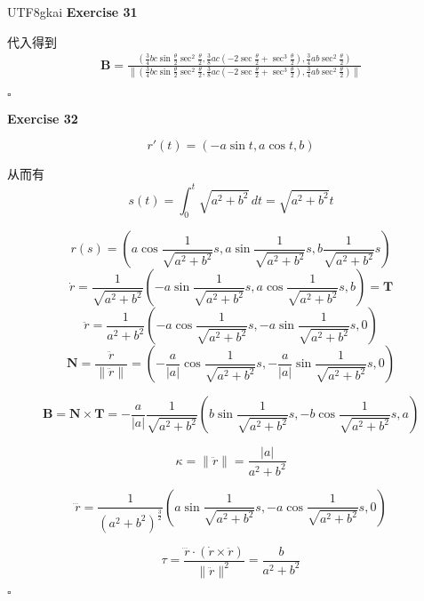 \documentclass[11pt,hyperref,a4paper,UTF8]{ctexart}
\newenvironment{exercise}[1]{%
{\textbf{Exercise #1} \\ 
    }
}{
  \hfill $\square$ 
  \par\bigskip 
}
\newcommand{\parameter}[1]{\left(#1\right)}
\newcommand{\ve}{\boldsymbol}
\begin{document}
\begin{CJK}{UTF8}{gkai}
\begin{exercise}{31}
    代入得到
    \[
        \begin{aligned}
        \ve{B} =  \frac{\parameter{\frac{3}{4}bc \sin \frac{\theta}{2} \sec^2 \frac{\theta}{2},\frac{3}{8}ac(-2\sec \frac{\theta}{2} + \sec^3 \frac{\theta}{2}),\frac{3}{4}ab\sec^2 \frac{\theta}{2}}}{\left\|\parameter{\frac{3}{4}bc \sin \frac{\theta}{2} \sec^2 \frac{\theta}{2},\frac{3}{8}ac(-2\sec \frac{\theta}{2} + \sec^3 \frac{\theta}{2}),\frac{3}{4}ab\sec^2 \frac{\theta}{2}}\right\|}
    \end{aligned}
    \]

\end{exercise}

\begin{exercise}{32}
    \[r'(t) = (-a\sin t,a \cos t,b)\]

    从而有
    \[s(t) = \int_{0}^{t}\sqrt{a^2 + b^2}\,dt = \sqrt{a^2 + b^2} t\]

    \[r(s) = (a \cos \frac{1}{\sqrt{a^2 + b^2}} s,a \sin \frac{1}{\sqrt{a^2 + b^2}} s,b \frac{1}{\sqrt{a^2 + b^2}} s)\]
    \[\dot{r} = \frac{1}{\sqrt{a^2 + b^2}}(-a \sin \frac{1}{\sqrt{a^2 + b^2}} s,a \cos \frac{1}{\sqrt{a^2 + b^2}} s,b) = \ve{T}\]
    \[\ddot{r} = \frac{1}{a^2 + b^2}(-a \cos \frac{1}{\sqrt{a^2 + b^2}} s,-a \sin \frac{1}{\sqrt{a^2 + b^2}} s,0)\]
    \[\ve{N} = \frac{\ddot{r}}{\|\ddot{r}\|} = (- \frac{a}{|a|} \cos \frac{1}{\sqrt{a^2 + b^2}} s,- \frac{a}{|a|} \sin \frac{1}{\sqrt{a^2 + b^2}} s,0)\]

    \[\ve{B} = \ve{N} \times \ve{T} = - \frac{a}{|a|} \frac{1}{\sqrt{a^2 + b^2}}(b \sin \frac{1}{\sqrt{a^2 + b^2}}s,-b \cos \frac{1}{\sqrt{a^2 + b^2}}s,a)\]

    \[\kappa = \|\ddot{r}\| = \frac{|a|}{a^2 + b^2}\]

    \[\dddot{r} = \frac{1}{(a^2 + b^2)^\frac{3}{2}}(a \sin \frac{1}{\sqrt{a^2 + b^2}} s,-a \cos \frac{1}{\sqrt{a^2 + b^2}} s,0)\]

    \[\tau = \frac{\dddot{r} \cdot (\dot{r} \times \ddot{r})}{\|\ddot{r}\|^2} = \frac{b}{a^2 + b^2}\]
\end{exercise}


\end{CJK}
\end{document}
